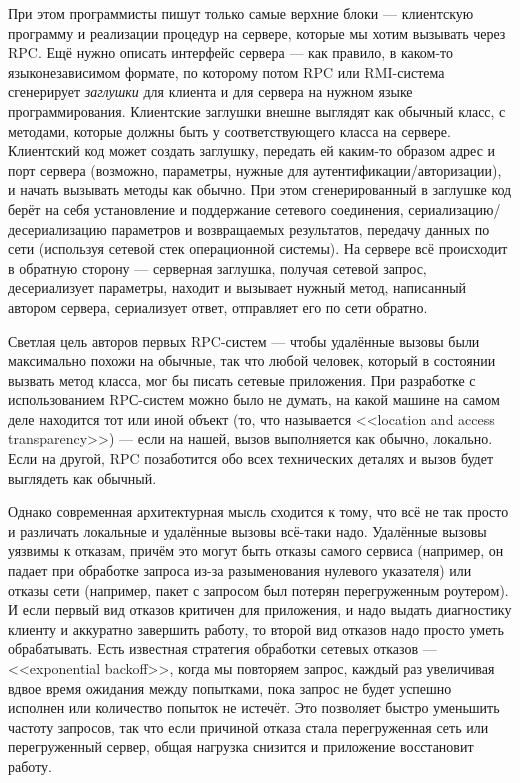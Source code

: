 \documentclass{../../text-style}
\begin{document}
При этом программисты пишут только самые верхние блоки --- клиентскую программу и реализации процедур на сервере, которые мы хотим вызывать через RPC. Ещё нужно описать интерфейс сервера --- как правило, в каком-то языконезависимом формате, по которому потом RPC или RMI-система сгенерирует \emph{заглушки} для клиента и для сервера на нужном языке программирования. Клиентские заглушки внешне выглядят как обычный класс, с методами, которые должны быть у соответствующего класса на сервере. Клиентский код может создать заглушку, передать ей каким-то образом адрес и порт сервера (возможно, параметры, нужные для аутентификации/авторизации), и начать вызывать методы как обычно. При этом сгенерированный в заглушке код берёт на себя установление и поддержание сетевого соединения, сериализацию/десериализацию параметров и возвращаемых результатов, передачу данных по сети (используя сетевой стек операционной системы). На сервере всё происходит в обратную сторону --- серверная заглушка, получая сетевой запрос, десериализует параметры, находит и вызывает нужный метод, написанный автором сервера, сериализует ответ, отправляет его по сети обратно.

Светлая цель авторов первых RPC-систем --- чтобы удалённые вызовы были максимально похожи на обычные, так что любой человек, который в состоянии вызвать метод класса, мог бы писать сетевые приложения. При разработке с использованием RPС-систем можно было не думать, на какой машине на самом деле находится тот или иной объект (то, что называется <<location and access transparency>>) --- если на нашей, вызов выполняется как обычно, локально. Если на другой, RPC позаботится обо всех технических деталях и вызов будет выглядеть как обычный.

Однако современная архитектурная мысль сходится к тому, что всё не так просто и различать локальные и удалённые вызовы всё-таки надо. Удалённые вызовы уязвимы к отказам, причём это могут быть отказы самого сервиса (например, он падает при обработке запроса из-за разыменования нулевого указателя) или отказы сети (например, пакет с запросом был потерян перегруженным роутером). И если первый вид отказов критичен для приложения, и надо выдать диагностику клиенту и аккуратно завершить работу, то второй вид отказов надо просто уметь обрабатывать. Есть известная стратегия обработки сетевых отказов --- <<exponential backoff>>, когда мы повторяем запрос, каждый раз увеличивая вдвое время ожидания между попытками, пока запрос не будет успешно исполнен или количество попыток не истечёт. Это позволяет быстро уменьшить частоту запросов, так что если причиной отказа стала перегруженная сеть или перегруженный сервер, общая нагрузка снизится и приложение восстановит работу.
\end{document}
